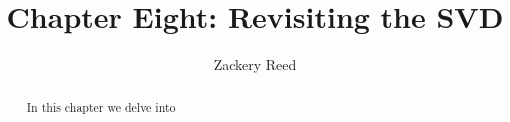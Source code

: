 \documentclass{xourse}
\title{Chapter Eight: Revisiting the SVD}
\author{Zackery Reed}
\begin{document}
\begin{abstract}
    In this chapter we delve into 
\end{abstract}
\maketitle

\sectionstyle
\end{document}
